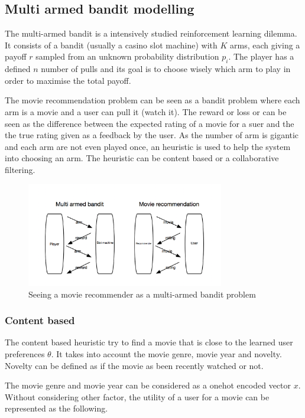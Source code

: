 \documentclass[letterpaper]{article}
\begin{document}
\subsection{Multi armed bandit modelling}

The multi-armed bandit is a intensively studied reinforcement learning dilemma. It consists of a bandit (usually a casino slot machine) with $K$ arms, each giving a payoff $r$ sampled from an unknown probability distribution $p_{i}$. The player has a defined $n$ number of pulls and its goal is to choose wisely which arm to play in order to maximise the total payoff.

The movie recommendation problem can be seen as a bandit problem where each arm is a movie and a user can pull it (watch it). The reward or loss or can be seen as the difference between the expected rating of a movie for a suer and the the true rating given as a feedback by the user. As the number of arm is gigantic and each arm are not even played once, an heuristic is used to help the system into choosing an arm. The heuristic can be content based or a collaborative filtering.

\begin{figure}[H]
\begin{center}
\includegraphics[width=3.4in]{img/schema.png}
\caption{Seeing a movie recommender as a multi-armed bandit problem}
\label{schema}
\end{center}
\end{figure}

\subsubsection{Content based}

The content based heuristic try to find a movie that is close to the learned user preferences $\theta$. It takes into account the movie genre, movie year and novelty. Novelty can be defined as if the movie as been recently watched or not.

The movie genre and movie year can be considered as a onehot encoded vector $x$.
Without considering other factor, the utility of a user for a movie can be represented as the following.
\end{document}
